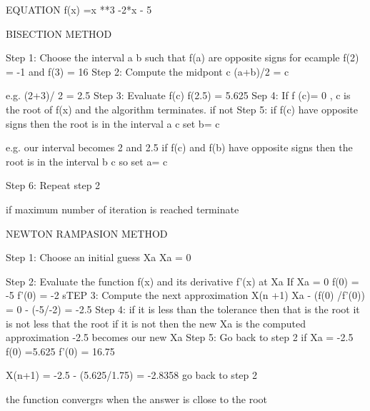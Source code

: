 \documentclass{}
\begin{document}
EQUATION
 f(x) =x **3 -2*x - 5

BISECTION METHOD

Step 1: Choose the interval a b such that f(a) are opposite signs
	for ecample f(2) = -1 and  f(3) = 16
Step 2: Compute the midpont c 
		(a+b)/2 = c

		e.g. (2+3)/ 2 = 2.5
Step 3: Evaluate f(c)
	f(2.5) = 5.625
Sep 4: If f (c)= 0 , c is the root of f(x) and the algorithm terminates.
if not 
Step 5: if f(c) have opposite signs then the root is in the interval a c 
	set b= c
	
	e.g. our interval becomes 2 and 2.5
	if f(c) and f(b) have opposite signs then the root is in the interval b c so 
	set a= c

	
Step 6: Repeat step 2

	




if maximum number of iteration is reached terminate 



NEWTON RAMPASION METHOD

Step 1: Choose an initial guess Xa
	Xa = 0

Step 2: Evaluate the function f(x) and its derivative f'(x) at Xa
		If Xa = 0
	          f(0) = -5
		f'(0) = -2
sTEP 3: Compute the next approximation X(n +1)
	Xa - (f(0) /f'(0)) = 0 - (-5/-2) = -2.5
Step 4: if it is less than the tolerance then that is the root
		it is not less that the root
	if it is not then the new Xa is the computed approximation 
		-2.5 becomes our new Xa
Step 5: Go back to step 2
	if Xa = -2.5
	f(0) =5.625
	f'(0) = 16.75
	 

	X(n+1) = -2.5 - (5.625/1.75) = -2.8358
	go back to step 2

the function convergrs when the answer is cllose to the root
\end{document}
